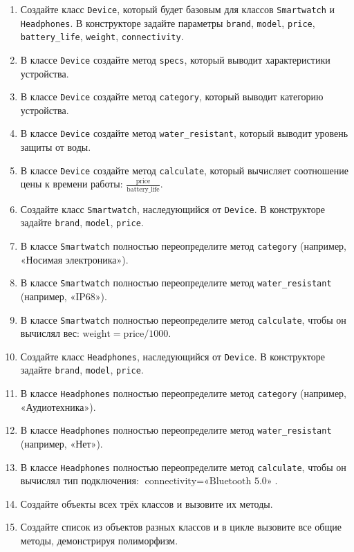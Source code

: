 \begin{enumerate}
\begin{enumerate}
    \item Создайте класс \texttt{Device}, который будет базовым для классов \texttt{Smartwatch} и \texttt{Headphones}. В конструкторе задайте параметры \texttt{brand}, \texttt{model}, \texttt{price}, \texttt{battery\_life}, \texttt{weight}, \texttt{connectivity}.
    \item В классе \texttt{Device} создайте метод \texttt{specs}, который выводит характеристики устройства.
    \item В классе \texttt{Device} создайте метод \texttt{category}, который выводит категорию устройства.
    \item В классе \texttt{Device} создайте метод \texttt{water\_resistant}, который выводит уровень защиты от воды.
    \item В классе \texttt{Device} создайте метод \texttt{calculate}, который вычисляет соотношение цены к времени работы: \( \frac{\text{price}}{\text{battery\_life}} \).
    \item Создайте класс \texttt{Smartwatch}, наследующийся от \texttt{Device}. В конструкторе задайте \texttt{brand}, \texttt{model}, \texttt{price}.
    \item В классе \texttt{Smartwatch} полностью переопределите метод \texttt{category} (например, «Носимая электроника»).
    \item В классе \texttt{Smartwatch} полностью переопределите метод \texttt{water\_resistant} (например, «IP68»).
    \item В классе \texttt{Smartwatch} полностью переопределите метод \texttt{calculate}, чтобы он вычислял вес: \( \text{weight} = \text{price} / 1000 \).
    \item Создайте класс \texttt{Headphones}, наследующийся от \texttt{Device}. В конструкторе задайте \texttt{brand}, \texttt{model}, \texttt{price}.
    \item В классе \texttt{Headphones} полностью переопределите метод \texttt{category} (например, «Аудиотехника»).
    \item В классе \texttt{Headphones} полностью переопределите метод \texttt{water\_resistant} (например, «Нет»).
    \item В классе \texttt{Headphones} полностью переопределите метод \texttt{calculate}, чтобы он вычислял тип подключения: \( \text{connectivity} = \text{«Bluetooth 5.0»} \).
    \item Создайте объекты всех трёх классов и вызовите их методы.
    \item Создайте список из объектов разных классов и в цикле вызовите все общие методы, демонстрируя полиморфизм.

\end{enumerate}
\end{enumerate}
